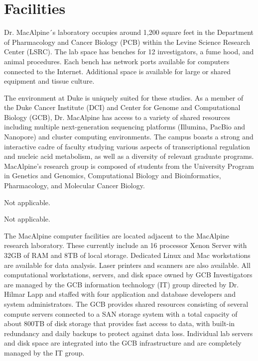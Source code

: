 \section*{Facilities}
Dr.  MacAlpine´s laboratory occupies around 1,200 square feet in the Department of Pharmacology and Cancer Biology (PCB) within the Levine Science Research Center (LSRC).  The lab space has benches for 12 investigators, a fume hood, and animal procedures.  Each bench has network ports available for computers connected to the Internet.  Additional space is available for large or shared equipment and tissue culture.

The environment at Duke is uniquely suited for these studies.  As a member of the Duke Cancer Institute  (DCI) and Center for Genome and Computational Biology (GCB), Dr. MacAlpine has access to a variety of shared resources including multiple next-generation sequencing platforms (Illumina, PacBio and Nanopore) and cluster computing environments.  The campus boasts a strong and interactive cadre of faculty studying various aspects of transcriptional regulation and nucleic acid metabolism, as well as a diversity of relevant graduate programs. MacAlpine's research group is composed of students from the University Program in Genetics and Genomics, Computational Biology and Bioinformatics, Pharmacology, and Molecular Cancer Biology.

Not applicable.

Not applicable.

The MacAlpine computer facilities are located adjacent to the MacAlpine research laboratory.  These currently include an 16 processor Xenon Server with 32GB of RAM and 8TB of local storage.  Dedicated Linux and Mac workstations are available for data analysis.   Laser printers and scanners are also available. All computational workstations, servers, and disk space owned by GCB Investigators are managed by the GCB information technology (IT) group directed by Dr. Hilmar Lapp and staffed with four application and database developers and system administrators.  The GCB provides shared resources consisting of several compute servers connected to a SAN storage system with a total capacity of about 800TB of disk storage that provides fast access to data, with built-in redundancy and daily backups to protect against data loss.  Individual lab servers and disk space are integrated into the GCB infrastructure and are completely managed by the IT group.  
 
